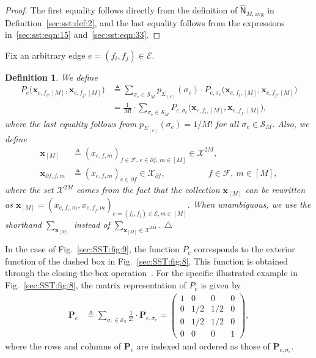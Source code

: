 \documentclass[journal]{IEEEtran}
\newcommand{\add}[1]{{\color{black}#1}}
\newtheorem{definition}[theorem]{Definition}
\newcommand{\manualendsymbol}[1]{%
  \leavevmode\unskip\penalty9999\hbox{}\nobreak\hfill
  \quad\hbox{#1}}
\newcommand{\edefinition}{\manualendsymbol{\ensuremath{\triangle}}}
\newcommand{\vect}[1]{ \bm{#1} }
\newcommand{\set}[1]{\mathcal{#1}}
\newcommand{\setEfull}{ \mathcal{E} }
\newcommand{\setF}{ \mathcal{F} }
\newcommand{\setpf}{ \partial f }
\newcommand{\setx}{ \mathcal{X} }
\newcommand{\vx}{ \vect{x} }
\newcommand{\graphN}{ \mathsf{N} }
\newcommand{\defeq}{ \triangleq }
\newcommand{\matr}[1]{\vect{#1}}
\newcommand{\Sigmae}{\Sigma_{(e)}}
\newcommand{\hgraphNavg}{ \hat{\graphN}_{M,\mathrm{avg}} }
\newcommand{\efi}{ e,f_i }
\newcommand{\efj}{ e,f_j }
\newcommand{\setpff}{ \partial f, f }
\begin{document}
\begin{proof}
  The first equality  follows directly from the definition of $\hgraphNavg$ in Definition~\ref{sec:sst:def:2}, and the last equality follows from the expressions in~\eqref{sec:sst:eqn:15} and~\eqref{sec:sst:eqn:33}.
\end{proof}

\add{Fix an arbitrary} edge $e = (f_{i}, f_{j}) \in \setEfull$.

\begin{definition}\label{sec:sst:def:4}
  We define
  \begin{align*}
    \!P_e\bigl( \vx_{\efi,[M]}, \vx_{\efj,[M]} \bigr)
    \!\! & \defeq\!\!\!\!\!
    \sum_{\sigma_e \in \set{S}_M}
    \!\!\!\!p_{\Sigmae}(\sigma_e)
    \!\cdot\!
    P_{e,\sigma_e}\bigl( \vx_{\efi,[M]}, \vx_{\efj,[M]} \bigr)
    \\&= \frac{1}{M!}
    \cdot
    \sum_{\sigma_e \in \set{S}_M} P_{e,\sigma_e}\bigl( \vx_{\efi,[M]}, \vx_{\efj,[M]} \bigr),
  \end{align*}
  where the last equality follows from $p_{\Sigmae}(\sigma_e) = 1/M!$ for all
  $\sigma_e \in \set{S}_M$. Also, we define
  \begin{align*}
    \vx_{[M]}       & \defeq ( x_{e,f,m} )_{f \in \setF,\,e \in \setpf,\,m \in [M]}
    \in \setx^{2M},
    \nonumber                                                                       \\
    \vx_{\setpff,m} & \defeq ( x_{e,f,m} )_{e \in \setpf} \in \set{X}_{\setpf},
    \qquad \qquad \quad f \in \setF, \ m \in [M],
  \end{align*}
  where the set $ \setx^{2M} $ comes from the fact that the collection $ \vx_{[M]} $
  can be rewritten as
  $ \vx_{[M]} = ( x_{e,f_{i},m},x_{e,f_{j},m} )_{e =(f_{i},f_{j}) \in \setEfull,m \in [M]} $.
  \add{When unambiguous, we use the shorthand $ \sum_{\vx_{[M]}} $ instead of
    $ \sum_{\vx_{[M]} \in \setx^{2M}} $.}
  \edefinition
\end{definition}

In the case of Fig.~\ref{sec:SST:fig:9}, the function $P_e$ corresponds to the exterior function of the dashed box in Fig.~\ref{sec:SST:fig:8}. This function is obtained through the closing-the-box operation~\cite{Loeliger2004}. For the specific illustrated example in Fig.~\ref{sec:SST:fig:8}, the
matrix representation of $ P_e $ is given by
\begin{align}
  \matr{P}_e
   & \defeq
  \sum_{\sigma_{e} \in \set{S}_2}
  \frac{1}{2!}
  \cdot
  \matr{P}_{e,\sigma_e}
  = \begin{pmatrix}
      1 & 0   & 0   & 0 \\
      0 & 1/2 & 1/2 & 0 \\
      0 & 1/2 & 1/2 & 0 \\
      0 & 0   & 0   & 1
    \end{pmatrix}
  \label{sec:sst:eqn:1},
\end{align}
\add{where the rows and columns of $\matr{P}_e$ are indexed and ordered as those of $\matr{P}_{e,\sigma_e}$.}
\end{document}

